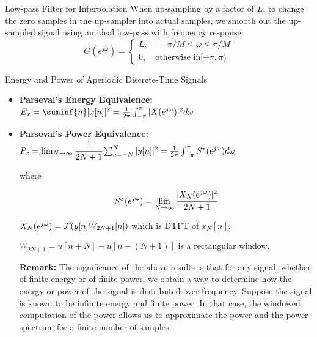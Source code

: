 \documentclass[aspectratio=169,xcolor=dvipsnames,svgnames,x11names,fleqn]{beamer}
\begin{document}
\begin{frame}{Low-pass Filter for Interpolation}
    When up-sampling by a factor of $L$, to change the zero samples in the up-sampler into actual samples, we smooth out the up-sampled signal using an ideal low-pass with frequency response
$$
G(e^{j\omega}) = \begin{cases}
    L , \quad -\pi/M \leq \omega \leq \pi/M\\
    0, \quad \textrm{otherwise in} [-\pi, \pi)
\end{cases}
$$

\end{frame}


\begin{frame}{Energy and Power of Aperiodic Discrete-Time Signals}

\small 
\begin{itemize}
    \item \textbf{Parseval's Energy Equivalence:} $E_x = \suminf{n}|x[n]|^2 = \tfrac{1}{2\pi} \int_{-\pi}^\pi |X(e^{j\omega})|^2 d \omega$

    \item \textbf{Parseval's Power Equivalence:} $P_x = \lim_{N\to \infty} \cfrac{1}{2N+1} \sum_{n=-N}^N |y[n]|^2 = \tfrac{1}{2\pi} \int_{-\pi}^\pi S^x(e^{j\omega})d\omega$

    where 

    $$
    S^x(e^{j\omega}) = \lim_{N \to \infty} \cfrac{| X_N(e^{j\omega})|^2}{2N + 1}
    $$

    $X_N(e^{j\omega}) = {\mathcal F}( y[n] W_{2N+1}[n])$ which is DTFT of $x_N[n]$.

    $W_{2N+1} = u[n+N] - u[n - (N+1)]$ is a rectangular window.

\textbf{Remark:}  The significance of the above results is that for any signal, whether of finite energy or of finite power,
we obtain a way to determine how the energy or power of the signal is distributed over frequency.  Suppose the signal is known to be infinite energy and finite power. In that case, the windowed computation of the power allows us to approximate the power and the power spectrum for a finite number of samples.
    
\end{itemize}
    
\end{frame}
\end{document}
